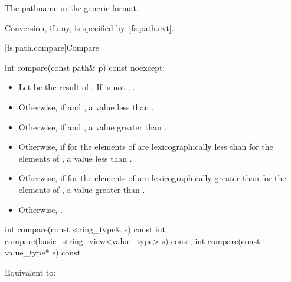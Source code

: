 \begin{itemdescr}
\pnum
\returns
The pathname in the generic format.

\pnum
\remarks
Conversion, if any, is specified by~\ref{fs.path.cvt}.
\end{itemdescr}

[fs.path.compare]{Compare}

%
\begin{itemdecl}
int compare(const path& p) const noexcept;
\end{itemdecl}

\begin{itemdescr}
\pnum
\returns
\begin{itemize}
\item
  Let  be the result of
  .
  If  is not ,
  .
\item
  Otherwise, if
   and ,
  a value less than .
\item
  Otherwise, if
   and ,
  a value greater than .
\item
  Otherwise, if
   for the elements of 
  are lexicographically less than
   for the elements of ,
  a value less than .
\item
  Otherwise, if
   for the elements of 
  are lexicographically greater than
   for the elements of ,
  a value greater than .
\item
  Otherwise, .
\end{itemize}
\end{itemdescr}

%
\begin{itemdecl}
int compare(const string_type& s) const
int compare(basic_string_view<value_type> s) const;
int compare(const value_type* s) const
\end{itemdecl}

\begin{itemdescr}
\pnum
\effects
Equivalent to: 
\end{itemdescr}


